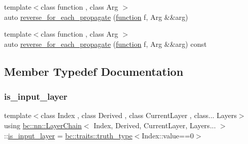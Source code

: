 \begin{DoxyCompactItemize}
\item 
{\footnotesize template$<$class function , class Arg $>$ }\\auto \hyperlink{structbc_1_1nn_1_1LayerChain_3_01Index_00_01Derived_00_01CurrentLayer_00_01Layers_8_8_8_01_4_a9d184e2b7369d4eb0e44ec58c6ded380}{reverse\+\_\+for\+\_\+each\+\_\+propagate} (\hyperlink{namespacebc_1_1nn_a0fef36d0002a6d7c7cb619d7e27d5c1e}{function} f, Arg \&\&arg)
\item 
{\footnotesize template$<$class function , class Arg $>$ }\\auto \hyperlink{structbc_1_1nn_1_1LayerChain_3_01Index_00_01Derived_00_01CurrentLayer_00_01Layers_8_8_8_01_4_a1ab820feb3d7d8d6bea9bb03d2716178}{reverse\+\_\+for\+\_\+each\+\_\+propagate} (\hyperlink{namespacebc_1_1nn_a0fef36d0002a6d7c7cb619d7e27d5c1e}{function} f, Arg \&\&arg) const
\end{DoxyCompactItemize}


\subsection{Member Typedef Documentation}
\mbox{\label{structbc_1_1nn_1_1LayerChain_3_01Index_00_01Derived_00_01CurrentLayer_00_01Layers_8_8_8_01_4_a1adb271b279e22cae29459160e1eea6b}} 
\subsubsection{\texorpdfstring{is\+\_\+input\+\_\+layer}{is\_input\_layer}}
{\footnotesize\ttfamily template$<$class Index , class Derived , class Current\+Layer , class... Layers$>$ \\
using \hyperlink{structbc_1_1nn_1_1LayerChain}{bc\+::nn\+::\+Layer\+Chain}$<$ Index, Derived, Current\+Layer, Layers... $>$\+::\hyperlink{structbc_1_1nn_1_1LayerChain_3_01Index_00_01Derived_00_01CurrentLayer_00_01Layers_8_8_8_01_4_a1adb271b279e22cae29459160e1eea6b}{is\+\_\+input\+\_\+layer} =  \hyperlink{namespacebc_1_1traits_ac91a9795000ae7f483efbaf74c9872e8}{bc\+::traits\+::truth\+\_\+type}$<$Index\+::value==0$>$}

